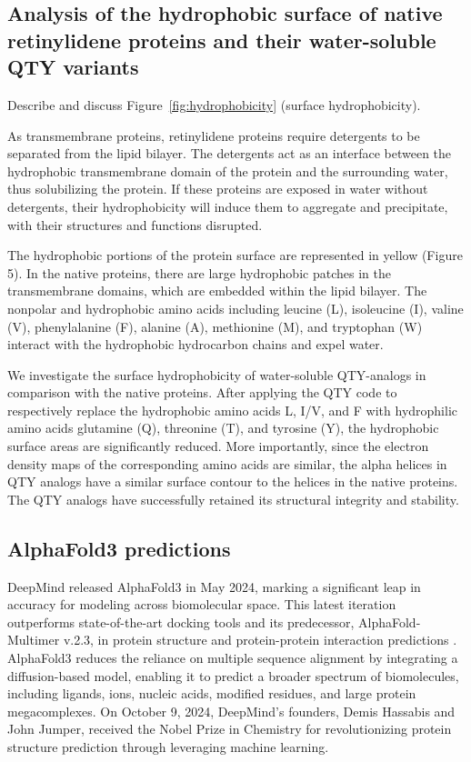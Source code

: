 \documentclass[fleqn, 10pt, lineno]{manuscript}
\begin{document}
\subsection*{Analysis of the hydrophobic surface of native retinylidene proteins and their water-soluble QTY variants}

Describe and discuss Figure~\ref{fig:hydrophobicity} (surface hydrophobicity). 

As transmembrane proteins, retinylidene proteins require detergents to be separated from the lipid bilayer. The detergents act as an interface between the hydrophobic transmembrane domain of the protein and the surrounding water, thus solubilizing the protein. If these proteins are exposed in water without detergents, their hydrophobicity will induce them to aggregate and precipitate, with their structures and functions disrupted. 

The hydrophobic portions of the protein surface are represented in yellow (Figure 5). In the native proteins, there are large hydrophobic patches in the transmembrane domains, which are embedded within the lipid bilayer. The nonpolar and hydrophobic amino acids including leucine (L), isoleucine (I), valine (V), phenylalanine (F), alanine (A), methionine (M), and tryptophan (W) interact with the hydrophobic hydrocarbon chains and expel water. 

We investigate the surface hydrophobicity of water-soluble QTY-analogs in comparison with the native proteins. After applying the QTY code to respectively replace the hydrophobic amino acids L, I/V, and F with hydrophilic amino acids glutamine (Q), threonine (T), and tyrosine (Y), the hydrophobic surface areas are significantly reduced. More importantly, since the electron density maps of the corresponding amino acids are similar, the alpha helices in QTY analogs have a similar surface contour to the helices in the native proteins. The QTY analogs have successfully retained its structural integrity and stability. 

\subsection*{AlphaFold3 predictions}

DeepMind released AlphaFold3 in May 2024, marking a significant leap in accuracy for modeling across biomolecular space. This latest iteration outperforms state-of-the-art docking tools and its predecessor, AlphaFold-Multimer v.2.3, in protein structure and protein-protein interaction predictions \citep{Abramson_2024}. AlphaFold3 reduces the reliance on multiple sequence alignment by integrating a diffusion-based model, enabling it to predict a broader spectrum of biomolecules, including ligands, ions, nucleic acids, modified residues, and large protein megacomplexes. On October 9, 2024, DeepMind’s founders, Demis Hassabis and John Jumper, received the Nobel Prize in Chemistry for revolutionizing protein structure prediction through leveraging machine learning. 
\end{document}
